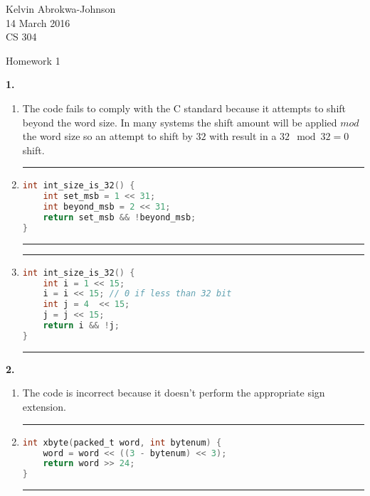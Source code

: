 \documentclass[11pt]{article} %
\newcommand{\hr}{\noindent\rule{14cm}{0.4pt}}
\begin{document}
 

\noindent Kelvin Abrokwa-Johnson \\
14 March 2016 \\
CS 304

\begin{center} Homework 1 \end{center}


{\bf 1.}

\begin{enumerate}[label=\alph*)]

\item
The code fails to comply with the C standard because it attempts to shift beyond the word size. In many systems the shift amount will be applied $mod$ the word size so an attempt to shift by $32$ with result in a $32 \mod 32 = 0$ shift.

\item
\hr
\begin{lstlisting}[language=C]
int int_size_is_32() {
	int set_msb = 1 << 31;
	int beyond_msb = 2 << 31;
	return set_msb && !beyond_msb;
}
\end{lstlisting}
\hr


\item
\hr
\begin{lstlisting}[language=C]
int int_size_is_32() {
	int i = 1 << 15;
	i = i << 15; // 0 if less than 32 bit
	int j = 4  << 15;
	j = j << 15;
	return i && !j;
}
\end{lstlisting}
\hr
\end{enumerate}




\vspace{0.5in}
{\bf 2.}

\begin{enumerate}[label=\alph*)]
\item 
The code is incorrect because it doesn't perform the appropriate sign extension.

\item
\hr
\begin{lstlisting}[language=C]
int xbyte(packed_t word, int bytenum) {
	word = word << ((3 - bytenum) << 3);
	return word >> 24;
}
\end{lstlisting}
\hr
\end{enumerate}
\end{document}
